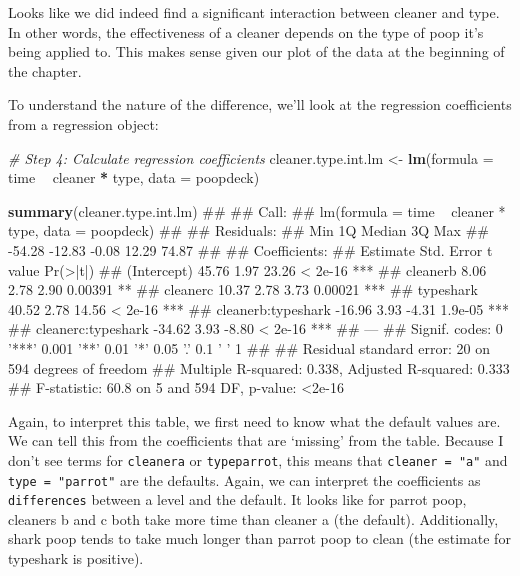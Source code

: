 \documentclass[]{book}
\newenvironment{Shaded}{\begin{snugshade}}{\end{snugshade}}
\newcommand{\KeywordTok}[1]{\textcolor[rgb]{0.13,0.29,0.53}{\textbf{#1}}}
\newcommand{\DataTypeTok}[1]{\textcolor[rgb]{0.13,0.29,0.53}{#1}}
\newcommand{\StringTok}[1]{\textcolor[rgb]{0.31,0.60,0.02}{#1}}
\newcommand{\CommentTok}[1]{\textcolor[rgb]{0.56,0.35,0.01}{\textit{#1}}}
\newcommand{\OperatorTok}[1]{\textcolor[rgb]{0.81,0.36,0.00}{\textbf{#1}}}
\newcommand{\NormalTok}[1]{#1}
\theoremstyle{definition}
\theoremstyle{definition}
\theoremstyle{remark}
\begin{document}
Looks like we did indeed find a significant interaction between cleaner
and type. In other words, the effectiveness of a cleaner depends on the
type of poop it's being applied to. This makes sense given our plot of
the data at the beginning of the chapter.

To understand the nature of the difference, we'll look at the regression
coefficients from a regression object:

\begin{Shaded}
\begin{Highlighting}[]
\CommentTok{# Step 4: Calculate regression coefficients}
\NormalTok{cleaner.type.int.lm <-}\StringTok{ }\KeywordTok{lm}\NormalTok{(}\DataTypeTok{formula =}\NormalTok{ time }\OperatorTok{~}\StringTok{ }\NormalTok{cleaner }\OperatorTok{*}\StringTok{ }\NormalTok{type,}
                          \DataTypeTok{data =}\NormalTok{ poopdeck)}

\KeywordTok{summary}\NormalTok{(cleaner.type.int.lm)}
\NormalTok{## }
\NormalTok{## Call:}
\NormalTok{## lm(formula = time ~ cleaner * type, data = poopdeck)}
\NormalTok{## }
\NormalTok{## Residuals:}
\NormalTok{##    Min     1Q Median     3Q    Max }
\NormalTok{## -54.28 -12.83  -0.08  12.29  74.87 }
\NormalTok{## }
\NormalTok{## Coefficients:}
\NormalTok{##                    Estimate Std. Error t value Pr(>|t|)    }
\NormalTok{## (Intercept)           45.76       1.97   23.26  < 2e-16 ***}
\NormalTok{## cleanerb               8.06       2.78    2.90  0.00391 ** }
\NormalTok{## cleanerc              10.37       2.78    3.73  0.00021 ***}
\NormalTok{## typeshark             40.52       2.78   14.56  < 2e-16 ***}
\NormalTok{## cleanerb:typeshark   -16.96       3.93   -4.31  1.9e-05 ***}
\NormalTok{## cleanerc:typeshark   -34.62       3.93   -8.80  < 2e-16 ***}
\NormalTok{## ---}
\NormalTok{## Signif. codes:  0 '***' 0.001 '**' 0.01 '*' 0.05 '.' 0.1 ' ' 1}
\NormalTok{## }
\NormalTok{## Residual standard error: 20 on 594 degrees of freedom}
\NormalTok{## Multiple R-squared:  0.338,  Adjusted R-squared:  0.333 }
\NormalTok{## F-statistic: 60.8 on 5 and 594 DF,  p-value: <2e-16}
\end{Highlighting}
\end{Shaded}

Again, to interpret this table, we first need to know what the default
values are. We can tell this from the coefficients that are `missing'
from the table. Because I don't see terms for \texttt{cleanera} or
\texttt{typeparrot}, this means that \texttt{cleaner\ =\ "a"} and
\texttt{type\ =\ "parrot"} are the defaults. Again, we can interpret the
coefficients as \texttt{differences} between a level and the default. It
looks like for parrot poop, cleaners b and c both take more time than
cleaner a (the default). Additionally, shark poop tends to take much
longer than parrot poop to clean (the estimate for typeshark is
positive).
\end{document}
